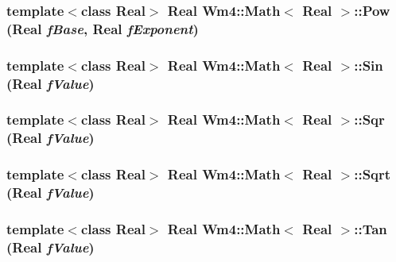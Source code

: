 \subsubsection{\setlength{\rightskip}{0pt plus 5cm}template$<$class Real$>$ Real {\bf Wm4::Math}$<$ Real $>$::Pow (Real {\em f\-Base}, Real {\em f\-Exponent})\hspace{0.3cm}{\tt  [static]}}\label{classWm4_1_1Math_fdce58a0449eacd2eb637d8ff77bb02c}


\subsubsection{\setlength{\rightskip}{0pt plus 5cm}template$<$class Real$>$ Real {\bf Wm4::Math}$<$ Real $>$::Sin (Real {\em f\-Value})\hspace{0.3cm}{\tt  [static]}}\label{classWm4_1_1Math_4840a7be35d06c9434c9f0b7355ef53a}


\subsubsection{\setlength{\rightskip}{0pt plus 5cm}template$<$class Real$>$ Real {\bf Wm4::Math}$<$ Real $>$::Sqr (Real {\em f\-Value})\hspace{0.3cm}{\tt  [static]}}\label{classWm4_1_1Math_c5800eb19a5392fadc476e42b9a5b8a4}


\subsubsection{\setlength{\rightskip}{0pt plus 5cm}template$<$class Real$>$ Real {\bf Wm4::Math}$<$ Real $>$::Sqrt (Real {\em f\-Value})\hspace{0.3cm}{\tt  [static]}}\label{classWm4_1_1Math_682df77a16fb68959c657ef2889b4797}


\subsubsection{\setlength{\rightskip}{0pt plus 5cm}template$<$class Real$>$ Real {\bf Wm4::Math}$<$ Real $>$::Tan (Real {\em f\-Value})\hspace{0.3cm}{\tt  [static]}}\label{classWm4_1_1Math_11b14bcbcb1683b01521e98e93c8b5fc}


